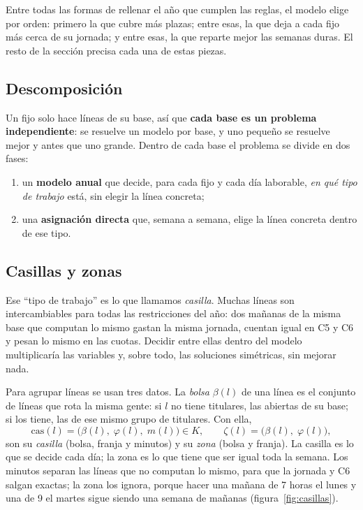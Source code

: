 \documentclass[11pt,a4paper]{article}
\begin{document}
Entre todas las formas de rellenar el año que cumplen las reglas, el modelo elige por orden:
primero la que cubre más plazas; entre esas, la que deja a cada fijo más cerca de su jornada;
y entre esas, la que reparte mejor las semanas duras. El resto de la sección precisa cada una de
estas piezas.

\subsection{Descomposición}

Un fijo solo hace líneas de su base, así que \textbf{cada base es un problema independiente}: se
resuelve un modelo por base, y uno pequeño se resuelve mejor y antes que uno grande. Dentro de
cada base el problema se divide en dos fases:
\begin{enumerate}[nosep]
  \item un \textbf{modelo anual} que decide, para cada fijo y cada día laborable, \emph{en qué
        tipo de trabajo} está, sin elegir la línea concreta;
  \item una \textbf{asignación directa} que, semana a semana, elige la línea concreta dentro de
        ese tipo.
\end{enumerate}

\subsection{Casillas y zonas}

Ese ``tipo de trabajo'' es lo que llamamos \emph{casilla}. Muchas líneas son intercambiables para
todas las restricciones del año: dos mañanas de la misma base que computan lo mismo gastan la
misma jornada, cuentan igual en C5 y C6 y pesan lo mismo en las cuotas. Decidir entre ellas
dentro del modelo multiplicaría las variables y, sobre todo, las soluciones simétricas, sin
mejorar nada.

Para agrupar líneas se usan tres datos. La \emph{bolsa} $\beta(l)$ de una línea es el conjunto
de líneas que rota la misma gente: si $l$ no tiene titulares, las abiertas de su base; si los
tiene, las de ese mismo grupo de titulares. Con ella,
\[
  \mathrm{cas}(l) = \bigl(\beta(l),\; \varphi(l),\; m(l)\bigr) \in K,
  \qquad
  \zeta(l) = \bigl(\beta(l),\; \varphi(l)\bigr),
\]
son su \emph{casilla} (bolsa, franja y minutos) y su \emph{zona} (bolsa y franja). La casilla es
lo que se decide cada día; la zona es lo que tiene que ser igual toda la semana. Los minutos
separan las líneas que no computan lo mismo, para que la jornada y C6 salgan exactas; la zona
los ignora, porque hacer una mañana de 7 horas el lunes y una de 9 el martes sigue siendo una
semana de mañanas (figura~\ref{fig:casillas}).
\end{document}
